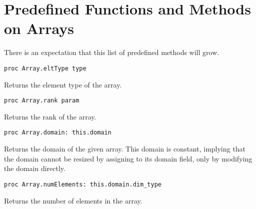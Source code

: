 \section{Predefined Functions and Methods on Arrays}
\label{Predefined_Functions_and_Methods_on_Arrays}

There is an expectation that this list of predefined methods will grow.

\begin{protohead}
\begin{verbatim}
proc Array.eltType type
\end{verbatim}
\end{protohead}
\begin{protobody}
Returns the element type of the array.
\end{protobody}

\begin{protohead}
\begin{verbatim}
proc Array.rank param
\end{verbatim}
\end{protohead}
\begin{protobody}
Returns the rank of the array.
\end{protobody}

\begin{protohead}
\begin{verbatim}
proc Array.domain: this.domain
\end{verbatim}
\end{protohead}
\begin{protobody}
Returns the domain of the given array.  This domain is constant,
implying that the domain cannot be resized by assigning to its domain
field, only by modifying the domain directly.
\end{protobody}

\begin{protohead}
\begin{verbatim}
proc Array.numElements: this.domain.dim_type
\end{verbatim}
\end{protohead}
\begin{protobody}
Returns the number of elements in the array.
\end{protobody}

